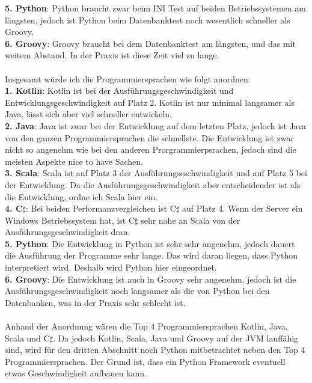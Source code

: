 \documentclass[ngerman]{article}
\begin{document}
    \textbf{5. Python}: Python braucht zwar beim INI Test auf beiden Betriebssystemen am längsten, jedoch ist Python beim Datenbanktest noch wesentlich schneller als Groovy.\\
    \textbf{6. Groovy}: Groovy braucht bei dem Datenbanktest am längsten, und das mit weitem Abstand. In der Praxis ist diese Zeit viel zu lange.\\\\
    Insgesamt würde ich die Programmiersprachen wie folgt anordnen:\\
    \textbf{1. Kotlin}: Kotlin ist bei der Ausführungsgeschwindigkeit und Entwicklungsgeschwindigkeit auf Platz 2. Kotlin ist nur minimal langsamer als Java, lässt sich aber viel schneller entwickeln.\\
    \textbf{2. Java}: Java ist zwar bei der Entwicklung auf dem letzten Platz, jedoch ist Java von den ganzen Programmiersprachen die schnellste. Die Entwicklung ist zwar nicht so angenehm wie bei den anderen Prorgrammierpsrachen, jedoch sind die meisten Aspekte nice to have Sachen.\\
    \textbf{3. Scala}: Scala ist auf Platz 3 der Ausführungseschwindigkeit und auf Platz 5 bei der Entwicklung. Da die Ausführungsgeschwindigkeit aber entscheidender ist als die Entwicklung, ordne ich Scala hier ein.\\
    \textbf{4. C$\sharp$}: Bei beiden Performanzvergleichen ist C$\sharp$ auf Platz 4. Wenn der Server ein Windows Betriebssystem hat, ist C$\sharp$ sehr nahe an Scala von der Ausführungsgeschwindigkeit dran.\\
    \textbf{5. Python}: Die Entwicklung in Python ist sehr sehr angenehm, jedoch dauert die Ausführung der Programme sehr lange. Das wird daran liegen, dass Python interpretiert wird. Deshalb wird Python hier eingeordnet.\\
    \textbf{6. Groovy}: Die Entwicklung ist auch in Groovy sehr angenehm, jedoch ist die Ausführungsgeschwindigkeit noch langsamer als die von Python bei den Datenbanken, was in der Praxis sehr schlecht ist.\\\\
    Anhand der Anordnung wären die Top 4 Programmiersprachen Kotlin, Java, Scala und C$\sharp$. Da jedoch Kotlin, Scala, Java und Groovy auf der JVM lauffähig sind, wird für den dritten Abschnitt noch Python mitbetrachtet neben den Top 4 Programmiersprachen. Der Grund ist, dass ein Python Framework eventuell etwas Geschwindigkeit aufbauen kann.
    \newpage\noindent
\end{document}
